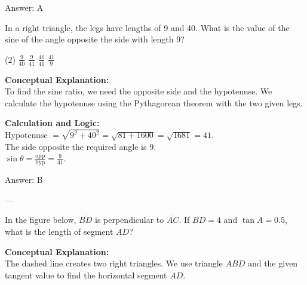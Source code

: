 \documentclass[11pt,paper=a4,answers]{exam}
\begin{document}
\begin{questions}
\begin{solution}
\vspace{15pt}
Answer: \colorbox{yellow!100}{A}
\end{solution}

\question
In a right triangle, the legs have lengths of 9 and 40. What is the value of the sine of the angle opposite the side with length 9?
\begin{tasks}(2)
    \task $\frac{9}{40}$
    \task $\frac{9}{41}$
    \task $\frac{40}{41}$
    \task $\frac{41}{9}$
\end{tasks}

\begin{solution}
\textbf{Conceptual Explanation:} \\
To find the sine ratio, we need the opposite side and the hypotenuse. We calculate the hypotenuse using the Pythagorean theorem with the two given legs.

\vspace{10pt}
\textbf{Calculation and Logic:} \\
Hypotenuse $= \sqrt{9^2 + 40^2} = \sqrt{81 + 1600} = \sqrt{1681} = 41$. \\
The side opposite the required angle is 9. \\
$\sin \theta = \frac{\text{opp}}{\text{hyp}} = \frac{9}{41}$.

\vspace{15pt}
Answer: \colorbox{yellow!100}{B}
\end{solution}

---

\question
In the figure below, $\overline{BD}$ is perpendicular to $\overline{AC}$. If $BD = 4$ and $\tan A = 0.5$, what is the length of segment $AD$?
\begin{center}
\end{center}

\begin{solution}
\textbf{Conceptual Explanation:} \\
The dashed line creates two right triangles. We use triangle $ABD$ and the given tangent value to find the horizontal segment $AD$.


\end{solution}
\end{questions}
\end{document}
